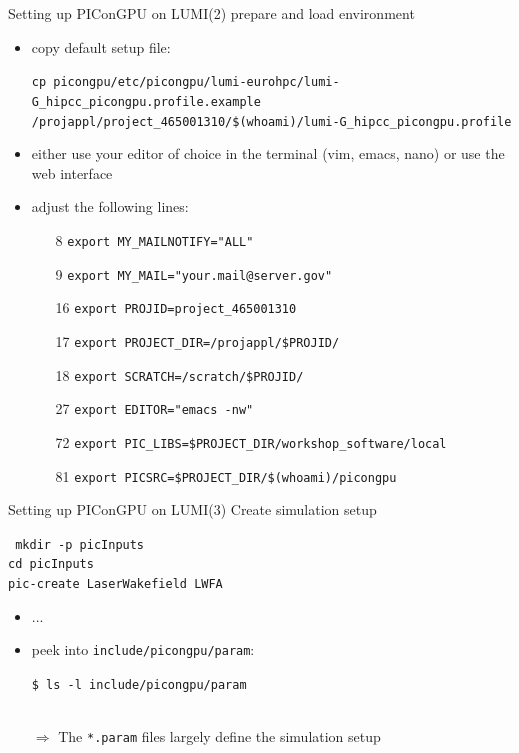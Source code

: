\documentclass[
  aspectratio=169,
  10pt
]{beamer}
\newcommand{\terminal}[1]{\par\noindent\colorbox{shadecolor}
{\parbox{\dimexpr\textwidth-2\fboxsep\relax}{\texttt{#1}}}}
\begin{document}
\begin{frame}[t,fragile]{Setting up PIConGPU on LUMI}{(2) prepare and load environment}

\begin{itemize}
    \item copy default setup file:
    \terminal{cp picongpu/etc/picongpu/lumi-eurohpc/lumi-G\_hipcc\_picongpu.profile.example /projappl/project\_465001310/\$(whoami)/lumi-G\_hipcc\_picongpu.profile}

    \item either use your editor of choice in the terminal (vim, emacs, nano) or use the web interface 
    \item adjust the following lines:
    \begin{enumerate}
        \item[8] \texttt{export MY\_MAILNOTIFY="ALL"}
        \item[9] \texttt{export MY\_MAIL="your.mail@server.gov"}
        \item[16] \texttt{export PROJID=project\_465001310}
        \item[17] \texttt{export PROJECT\_DIR=/projappl/\$PROJID/}
        \item[18] \texttt{export SCRATCH=/scratch/\$PROJID/}
        \item[27] \texttt{export EDITOR="emacs -nw"}
        \item[72] \texttt{export PIC\_LIBS=\$PROJECT\_DIR/workshop\_software/local}
        \item[81] \texttt{export PICSRC=\$PROJECT\_DIR/\$(whoami)/picongpu}
    \end{enumerate}
    
\end{itemize}

\end{frame}




\begin{frame}[t,fragile]{Setting up PIConGPU on LUMI}{(3) Create simulation setup}
    \terminal{%
        mkdir -p picInputs\\
        cd picInputs\\
        pic-create LaserWakefield LWFA
    }
\begin{itemize}
    \item ...
    \item peek into \texttt{include/picongpu/param}:\\
        \terminal{\$ ls -l include/picongpu/param}\\
        $\Rightarrow$ The \texttt{*.param} files largely define the simulation setup
\end{itemize}

\end{frame}
\end{document}
